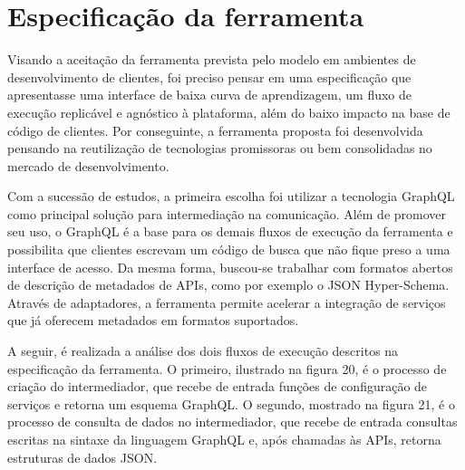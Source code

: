\section{Especificação da ferramenta}

Visando a aceitação da ferramenta prevista pelo modelo em ambientes de desenvolvimento de clientes, foi preciso pensar em uma especificação que apresentasse uma interface de baixa curva de aprendizagem, um fluxo de execução replicável e agnóstico à plataforma, além do baixo impacto na base de código de clientes. Por conseguinte, a ferramenta proposta foi desenvolvida pensando na reutilização de tecnologias promissoras ou bem consolidadas no mercado de desenvolvimento.

Com a sucessão de estudos, a primeira escolha foi utilizar a tecnologia GraphQL como principal solução para intermediação na comunicação. Além de promover seu uso, o GraphQL é a base para os demais fluxos de execução da ferramenta e possibilita que clientes escrevam um código de busca que não fique preso a uma interface de acesso. Da mesma forma, buscou-se trabalhar com formatos abertos de descrição de metadados de APIs, como por exemplo o JSON Hyper-Schema. Através de adaptadores, a ferramenta permite acelerar a integração de serviços que já oferecem metadados em formatos suportados.

A seguir, é realizada a análise dos dois fluxos de execução descritos na especificação da ferramenta. O primeiro, ilustrado na figura 20, é o processo de criação do intermediador, que recebe de entrada funções de configuração de serviços e retorna um esquema GraphQL. O segundo, mostrado na figura 21, é o processo de consulta de dados no intermediador, que recebe de entrada consultas escritas na sintaxe da linguagem GraphQL e, após chamadas às APIs, retorna estruturas de dados JSON.

